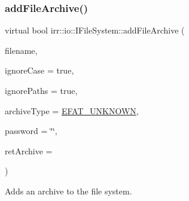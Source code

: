 \subsubsection{\texorpdfstring{add\+File\+Archive()}{addFileArchive()}\hspace{0.1cm}{\footnotesize\ttfamily [1/3]}}
{\footnotesize\ttfamily virtual bool irr\+::io\+::\+I\+File\+System\+::add\+File\+Archive (\begin{DoxyParamCaption}\item[{const \hyperlink{namespaceirr_1_1io_ab1bdc45edb3f94d8319c02bc0f840ee1}{path} \&}]{filename,  }\item[{bool}]{ignore\+Case = {\ttfamily true},  }\item[{bool}]{ignore\+Paths = {\ttfamily true},  }\item[{\hyperlink{namespaceirr_1_1io_adb3e3c445ec8e608ed1f0f93306da14f}{E\+\_\+\+F\+I\+L\+E\+\_\+\+A\+R\+C\+H\+I\+V\+E\+\_\+\+T\+Y\+PE}}]{archive\+Type = {\ttfamily \hyperlink{namespaceirr_1_1io_adb3e3c445ec8e608ed1f0f93306da14fa2c2aea9bc955ae4e0d29071ba66ff8dc}{E\+F\+A\+T\+\_\+\+U\+N\+K\+N\+O\+WN}},  }\item[{const \hyperlink{namespaceirr_1_1core_ade1071a878633f2f6d8a75c5d11fec19}{core\+::stringc} \&}]{password = {\ttfamily \char`\"{}\char`\"{}},  }\item[{\hyperlink{classirr_1_1io_1_1IFileArchive}{I\+File\+Archive} $\ast$$\ast$}]{ret\+Archive = {} }\end{DoxyParamCaption})\hspace{0.3cm}{\ttfamily [pure virtual]}}



Adds an archive to the file system. 

